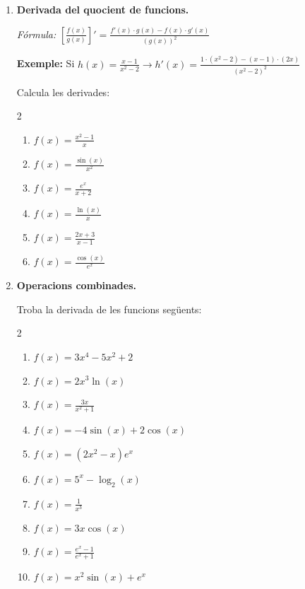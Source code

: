 \documentclass[12pt,a4paper]{article}
\begin{document}
\begin{enumerate}[leftmargin=*, label=\textbf{\arabic*.}]
    \item \textbf{Derivada del quocient de funcions.}
    
    \textit{Fórmula:} $\displaystyle \left[\frac{f(x)}{g(x)}\right]' = \frac{f'(x) \cdot g(x) - f(x) \cdot g'(x)}{(g(x))^2}$
    
    \textbf{Exemple:} Si $h(x) = \frac{x-1}{x^2-2} \rightarrow h'(x) = \frac{1 \cdot (x^2-2) - (x-1) \cdot (2x)}{(x^2-2)^2}$
    \vspace{0.2cm}
    
    Calcula les derivades:
    \begin{multicols}{2}
    \begin{enumerate}[label=\alph*)]
        \item $f(x) = \frac{x^2 - 1}{x}$
        \item $f(x) = \frac{\sin(x)}{x^2}$
        \item $f(x) = \frac{e^x}{x+2}$
        \item $f(x) = \frac{\ln(x)}{x}$
        \item $f(x) = \frac{2x + 3}{x - 1}$
        \item $f(x) = \frac{\cos(x)}{e^x}$
    \end{enumerate}
    \end{multicols}
    \vspace{0.4cm}

    \item \textbf{Operacions combinades.}
    
    \vspace{0.2cm}
    
    Troba la derivada de les funcions següents:
    \begin{multicols}{2}
    \begin{enumerate}[label=\alph*)]
        \item $f(x) = 3x^4 - 5x^2 + 2$
        \item $f(x) = 2x^3 \ln(x)$
        \item $f(x) = \frac{3x}{x^2 + 1}$
        \item $f(x) = -4\sin(x) + 2\cos(x)$
        \item $f(x) = (2x^2 - x)e^x$
        \item $f(x) = 5^x - \log_2(x)$
        \item $f(x) = \frac{1}{x^3}$
        \item $f(x) = 3x \cos(x)$
        \item $f(x) = \frac{e^x - 1}{e^x + 1}$
        \item $f(x) = x^2 \sin(x) + e^x$
    \end{enumerate}
    \end{multicols}

\end{enumerate}
\end{document}
